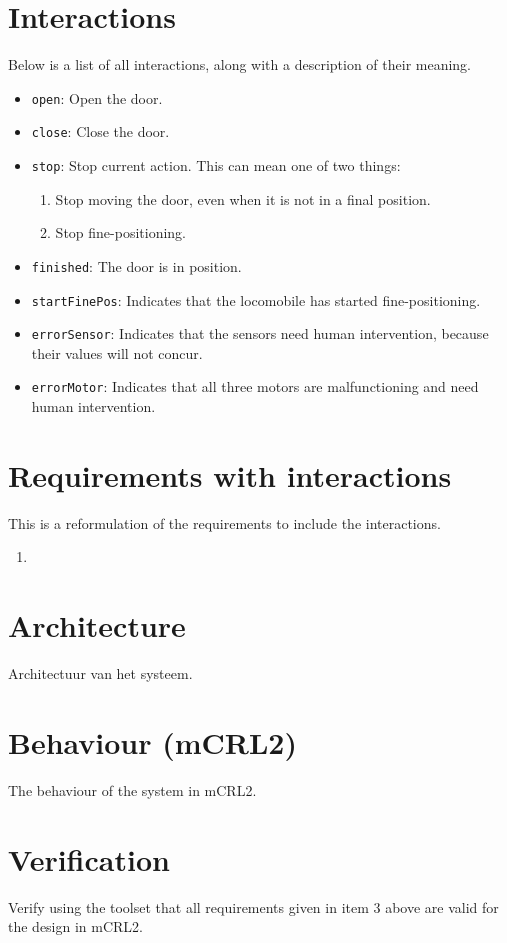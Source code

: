 \documentclass{article}
\begin{document}
\section{Interactions}
Below is a list of all interactions, along with a description of their meaning.

\begin{itemize}
    \item \texttt{open}:  Open the door.
    \item \texttt{close}: Close the door.
    \item \texttt{stop}:  Stop current action. This can mean one of two things:
        \begin{enumerate}
            \item Stop moving the door, even when it is not in a final position.
            \item Stop fine-positioning.
        \end{enumerate}

    \item \texttt{finished}: The door is in position.
    \item \texttt{startFinePos}: Indicates that the locomobile has started fine-positioning.
    \item \texttt{errorSensor}:  Indicates that the sensors need human intervention, because their values will not concur.
    \item \texttt{errorMotor}:  Indicates that all three motors are malfunctioning and need human intervention.
\end{itemize}

\section{Requirements with interactions}
This is a reformulation of the requirements to include the interactions.

\begin{enumerate}
    \item 
\end{enumerate}

\section{Architecture}
Architectuur van het systeem.

\section{Behaviour (mCRL2)}
The behaviour of the system in mCRL2.

\section{Verification}
Verify using the toolset that all requirements given in item 3 above are valid for the design
in mCRL2.
\end{document}
